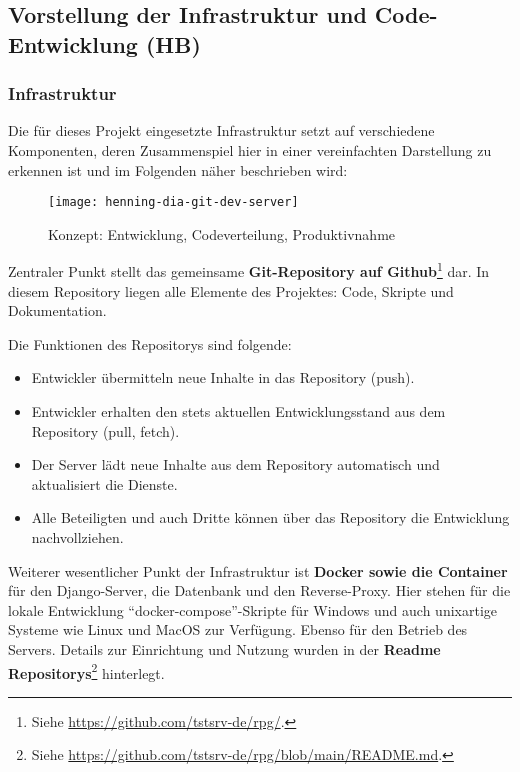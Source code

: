 

\subsection{Vorstellung der Infrastruktur und Code-Entwicklung (HB)}


\subsubsection{Infrastruktur}

Die für dieses Projekt eingesetzte Infrastruktur setzt auf verschiedene Komponenten, deren Zusammenspiel hier in einer vereinfachten Darstellung zu erkennen ist und im Folgenden näher beschrieben wird: 

\begin{figure}[H]
    \centering
    \label{fig:henning-dia-git-dev-server}
    \caption{Konzept: Entwicklung, Codeverteilung, Produktivnahme}
    \texttt{[image: henning-dia-git-dev-server]}
\end{figure}

Zentraler Punkt stellt das gemeinsame \textbf{Git-Repository auf Github}\footnote{Siehe \url{https://github.com/tstsrv-de/rpg/}.} dar. In diesem Repository liegen alle Elemente des Projektes: Code, Skripte und Dokumentation.

Die Funktionen des Repositorys sind folgende: \begin{itemize}
    \item Entwickler übermitteln neue Inhalte in das Repository (push).
    \item Entwickler erhalten den stets aktuellen Entwicklungsstand aus dem Repository (pull, fetch).
    \item Der Server lädt neue Inhalte aus dem Repository automatisch und aktualisiert die Dienste.
    \item Alle Beteiligten und auch Dritte können über das Repository die Entwicklung nachvollziehen. 
\end{itemize}

Weiterer wesentlicher Punkt der Infrastruktur ist \textbf{Docker sowie die Container} für den Django-Server, die Datenbank und den Reverse-Proxy. Hier stehen für die lokale Entwicklung \enquote{docker-compose}-Skripte für Windows und auch unixartige Systeme wie Linux und MacOS zur Verfügung. Ebenso für den Betrieb des Servers. Details zur Einrichtung und Nutzung wurden in der \textbf{Readme Repositorys}\footnote{Siehe \url{https://github.com/tstsrv-de/rpg/blob/main/README.md}.} hinterlegt. 

